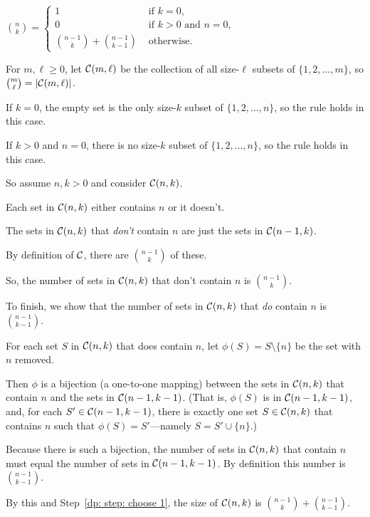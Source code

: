 \begin{lemma}\label{dp: lemma: pascal}
  \(\displaystyle {n \choose k} =
  \begin{cases}
    1 & \text{ if } k = 0, \\
    0 & \text{ if } k > 0 \text{ and } n = 0,  \\
    {n-1 \choose k} + {n-1 \choose k-1} & \text{ otherwise.}
  \end{cases}
  \)
\end{lemma}
\begin{longFormProof}
  \step For $m,\ell\ge 0$, let ${\cal C}(m,\ell)$ be the collection of all size-$\ell$ subsets of $\{1,2,\ldots,m\}$,
  so ${m \choose \ell} = |{\cal C}(m, \ell)|$.

  \step If $k=0$, the empty set is the only size-$k$ subset of $\{1,2,\ldots,n\}$,
  so the rule holds in this case.

  \step If $k>0$ and $n=0$, there is no size-$k$ subset of $\{1,2,\ldots,n\}$,
  so the rule holds in this case. 

  \step So assume $n, k > 0$ and consider ${\cal C}(n, k)$.  

  \step Each set in ${\cal C}(n, k)$ either contains $n$ or it doesn't.

  \smallskip

  \step The sets in ${\cal C}(n, k)$ that \emph{don't} contain $n$
  are just the sets in ${\cal C}(n-1,k)$.

  \step By definition of ${\cal C}$, there are $n-1 \choose k$ of these.

  \step\label{dp: step: choose 1}
  So, the number of sets in ${\cal C}(n, k)$ that don't contain $n$
  is $n-1\choose k$.

  \smallskip

  \step To finish, we show that the number of sets in ${\cal C}(n,k)$ that \emph{do} contain $n$ is $n-1\choose k-1$.

  \step For each set $S$ in ${\cal C}(n,k)$ that does contain $n$,
  let $\phi(S) = S\setminus\{n\}$ be the set with $n$ removed.

  \step Then $\phi$ is a bijection (a one-to-one mapping)
  between the sets in ${\cal C}(n, k)$ that contain $n$
  and the sets in ${\cal C}(n-1, k-1)$.
  (That is, $\phi(S)$ is in ${\cal C}(n-1, k-1)$,
  and, for each $S'\in{\cal C}(n-1,k-1)$,
  there is exactly one set $S\in{\cal C}(n,k)$ that contains $n$
  such that $\phi(S)=S'$---namely $S = S'\cup\{n\}$.)

  \step Because there is such a bijection,
  the number of sets in ${\cal C}(n, k)$ that contain $n$
  must equal the number of sets in ${\cal C}(n-1, k-1)$.
  By definition this number is $n-1\choose k-1$.

  \step By this and Step~\ref{dp: step: choose 1}, the size of ${\cal C}(n,k)$
  is ${n-1\choose k} + {n-1 \choose k-1}$.
  
\end{longFormProof}

